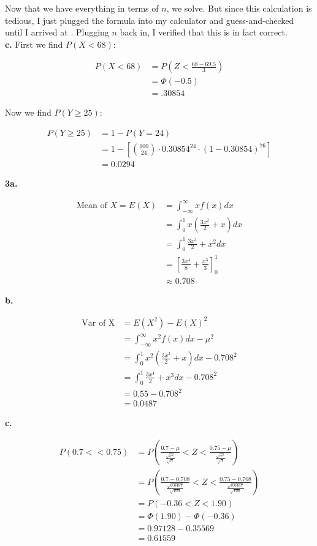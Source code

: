 \documentclass[12pt]{report}
\makeatletter
\newcommand*{\Xbar}{}%
\DeclareRobustCommand*{\Xbar}{%
	\mathpalette\@Xbar{}%
}
\newcommand*{\@Xbar}[2]{%
	\sbox0{$#1\mathrm{X}\m@th$}%
	\sbox2{$#1X\m@th$}%
	\rlap{%
		\hbox to\wd2{%
			\hfill
			$\overline{%
				\vrule width 0pt height\ht0 %
				\kern\wd0 %
			}$%
		}%
	}%
	\copy2 %
}
\makeatother
\begin{document}
\noindent Now that we have everything in terms of $n$, we solve. But since this calculation is tedious, I just plugged the formula into my calculator and guess-and-checked until I arrived at . Plugging $n$ back in, I verified that this is in fact correct.\\

\noindent \textbf{c.} First we find $P(X < 68)$:

\begin{align*}
	P(X < 68) &= P\left(Z < \frac{68 - 69.5}{3}\right)\\
	&= \Phi(-0.5)\\
	&= .30854
\end{align*}

\noindent Now we find $P(Y \geq 25)$:

\begin{align*}
	P(Y \geq 25) &= 1 - P(Y = 24)\\
	&= 1 - \left[{100 \choose 24} \cdot 0.30854^{24} \cdot (1-0.30854)^{76}\right]\\
	&= \boxed{0.0294}
\end{align*}

\pagebreak
\noindent \textbf{3a.} 

\begin{align*}
	\text{Mean of }X = E(X) &= \int_{-\infty}^{\infty}xf(x)dx\\
	&= \int_{0}^{1}x\left(\frac{3x^2}{2} + x\right)dx\\
	&= \int_{0}^{1}\frac{3x^3}{2} + x^2dx\\
	&= \left[\frac{3x^4}{8} + \frac{x^3}{3}\right]_0^1\\
	&\approx \boxed{0.708}
\end{align*}

\noindent \textbf{b.} 

\begin{align*}
	\text{Var of X} &= E(X^2) - E(X)^2\\
	&= \int_{-\infty}^{\infty} x^2 f(x)dx - \mu^2\\
	&= \int_{0}^{1} x^2\left(\frac{3x^2}{2} + x\right)dx - 0.708^2\\
	&= \int_{0}^{1}\frac{3x^4}{2} + x^3dx - 0.708^2\\
	&= 0.55 - 0.708^2\\
	&= \boxed{0.0487}
\end{align*}

\pagebreak
\noindent \textbf{c.} 

\begin{align*}
	P(0.7 < \Xbar < 0.75) &= P\left(\frac{0.7 - \mu}{\frac{\sqrt{\sigma^2}}{\sqrt{n}}} < Z < \frac{0.75 - \mu}{\frac{\sqrt{\sigma^2}}{\sqrt{n}}}\right)\\
	&= P\left(\frac{0.7 - 0.708}{\frac{\sqrt{0.0487}}{\sqrt{100}}} < Z < \frac{0.75 - 0.708}{\frac{\sqrt{0.0487}}{\sqrt{100}}}\right)\\
	&= P(-0.36 < Z < 1.90)\\
	&= \Phi(1.90) - \Phi(-0.36)\\
	&= 0.97128 - 0.35569\\
	&= \boxed{0.61559}
\end{align*}
\end{document}
